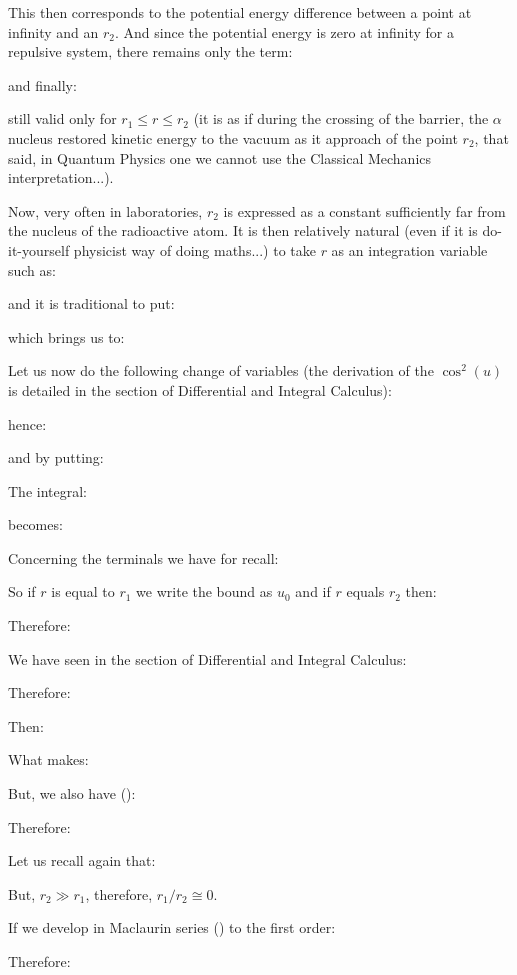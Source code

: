 	This then corresponds to the potential energy difference between a point at infinity and an $r_2$. And since the potential energy is zero at infinity for a repulsive system, there remains only the term:
	
	and finally:
	
	still valid only for $r_1\le r \le r_2$ (it is as if during the crossing of the barrier, the $\alpha$nucleus restored kinetic energy to the vacuum as it approach of the point $r_2$, that said, in Quantum Physics one we cannot use the Classical Mechanics interpretation...).

	Now, very often in laboratories, $r_2$ is expressed as a constant sufficiently far from the nucleus of the radioactive atom. It is then relatively natural (even if it is do-it-yourself physicist way of doing maths...) to take $r$ as an integration variable such as:
	
	and it is traditional to put:
	
	which brings us to:
	
	Let us now do the following change of variables (the derivation of the $\cos^2(u)$ is detailed in the section of Differential and Integral Calculus):
	
	hence:
	
	and by putting:
	
	The integral:
	
	becomes:
	
	Concerning the terminals we have for recall:
	
	So if $r$ is equal to $r_1$ we write the bound as $u_0$ and if $r$ equals $r_2$ then:
	
	Therefore:
	
	We have seen in the section of Differential and Integral Calculus:
	
	Therefore:
	
	Then:
	
	What makes:
	
	But, we also have ():
	
	Therefore:
	
	Let us recall again that:
	
	But, $r_2 \gg r_1$, therefore, $r_1/r_2\cong 0$.
	
	If we develop in Maclaurin series () to the first order:
	
	Therefore:
	

